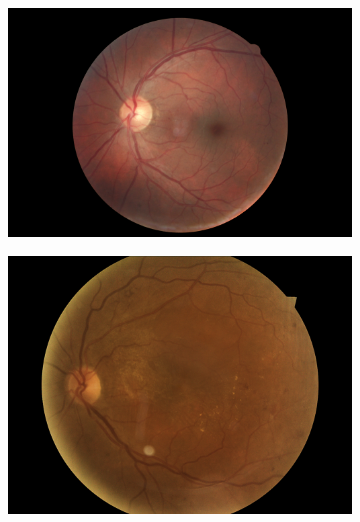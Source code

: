 \begin{figure}[htbp]
\begin{subfigure}[b]{0.19\textwidth}
    \end{subfigure}
    \hfill
    \begin{subfigure}[b]{0.19\textwidth}
         \centering
         \includegraphics[width=\textwidth, height=\textwidth]{figures/chapter4/Dataset/moderate/129_left.jpeg}
    \end{subfigure}
    \hfill
    \begin{subfigure}[b]{0.19\textwidth}
         \centering
         \includegraphics[width=\textwidth, height=\textwidth]{figures/chapter4/Dataset/severe/163_left.jpeg}

\end{subfigure}
\end{figure}
